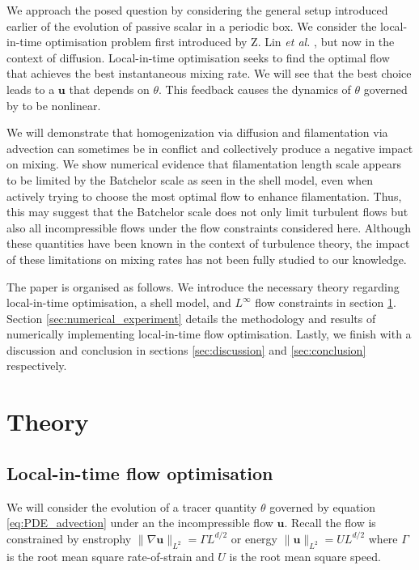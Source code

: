 \documentclass[12pt]{iopart}
\newcommand{\ltwo}[1]{\|#1\|_{L^{2}}}
\renewcommand{\vec}[1]{\mathbf{#1}}
\renewcommand{\u}{\mathbf{u}}
\begin{document}
We approach the posed question by considering the general setup introduced earlier of the evolution of passive scalar in a periodic box. We consider the local-in-time optimisation problem first introduced by Z. Lin {\it et al.} \cite{JFM2011}, but now in the context of diffusion. Local-in-time optimisation seeks to find the optimal flow that achieves the best instantaneous mixing rate. We will see that the best choice leads to a $\vec{u}$ that depends on $\theta$. This feedback causes the dynamics of $\theta$ governed by  to be nonlinear.

We will demonstrate that homogenization via diffusion and filamentation via advection can sometimes be in conflict and collectively produce a negative impact on mixing. We show numerical evidence that filamentation length scale appears to be limited by the Batchelor scale as seen in the shell model, even when actively trying to choose the most optimal flow to enhance filamentation. Thus, this may suggest that the Batchelor scale does not only limit turbulent flows but also all incompressible flows under the flow constraints considered here. Although these quantities have been known in the context of turbulence theory, the impact of these limitations on mixing rates has not been fully studied to our knowledge.


The paper is organised as follows. We introduce the necessary theory regarding local-in-time optimisation, a shell model, and $L^{\infty}$ flow constraints in section \ref{sec:theory}. Section \ref{sec:numerical_experiment} details the methodology and results of numerically implementing local-in-time flow optimisation. Lastly, we finish with a discussion and conclusion in sections \ref{sec:discussion} and \ref{sec:conclusion} respectively.





\section{Theory}
\label{sec:theory}
\subsection{Local-in-time flow optimisation}

We will consider the evolution of a tracer quantity $\theta$ governed by equation \ref{eq:PDE_advection} under an the incompressible flow $\vec{u}$.  Recall the flow is constrained by enstrophy $\ltwo{\nabla\u} = \Gamma L^{d/2}$ or energy $\ltwo{\u} = UL^{d/2}$ where $\Gamma$ is the root mean square rate-of-strain and $U$ is the root mean square speed. 
\end{document}
